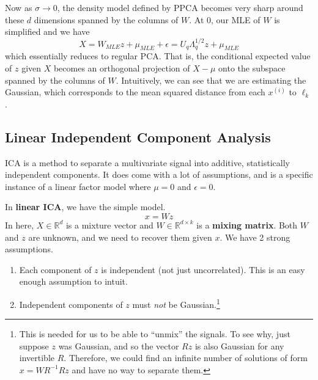 \documentclass{article}
\begin{document}
  Now as $\sigma \rightarrow 0$, the density model defined by PPCA becomes very sharp around these $d$ dimensions spanned by the columns of $W$. At $0$, our MLE of $W$ is simplified and we have 
  \begin{equation}
    X = W_{MLE} z + \mu_{MLE} + \epsilon = U_q \Lambda_q^{1/2} z + \mu_{MLE}
  \end{equation}
  which essentially reduces to regular PCA. That is, the conditional expected value of $z$ given $X$ becomes an orthogonal projection of $X - \mu$ onto the subspace spanned by the columns of $W$. Intuitively, we can see that we are estimating the Gaussian, which corresponds to the mean squared distance from each $x^{(i)}$ to $\ell_k$. 

\subsection{Linear Independent Component Analysis} 

  ICA is a method to separate a multivariate signal into additive, statistically independent components. It does come with a lot of assumptions, and is a specific instance of a linear factor model where $\mu = 0$ and $\epsilon = 0$. 

  \begin{definition}
    In \textbf{linear ICA}, we have the simple model. 
    \begin{equation}
      x = W z
    \end{equation}
    In here, $X \in \mathbb{R}^d$ is a mixture vector and $W \in \mathbb{R}^{d \times k}$ is a \textbf{mixing matrix}. Both $W$ and $z$ are unknown, and we need to recover them given $x$. We have 2 strong assumptions. 
    \begin{enumerate} 
      \item Each component of $z$ is independent (not just uncorrelated). This is an easy enough assumption to intuit.  
      \item Independent components of $z$ must \textit{not} be Gaussian.\footnote{This is needed for us to be able to ``unmix'' the signals. To see why, just suppose $z$ was Gaussian, and so the vector $Rz$ is also Gaussian for any invertible $R$. Therefore, we could find an infinite number of solutions of form $x = W R^{-1} R z$ and have no way to separate them.}
    \end{enumerate}
  \end{definition}
\end{document}
